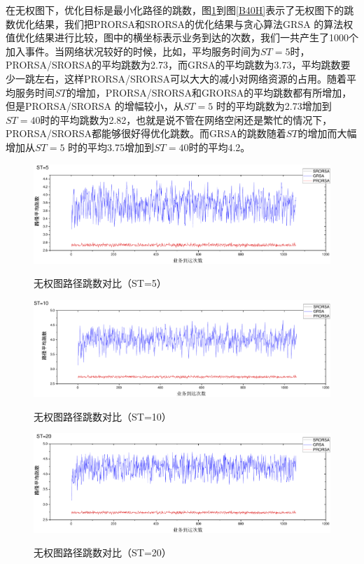 在无权图下，优化目标是最小化路径的跳数，图\ref{B5H}到图\ref{B40H}表示了无权图下的跳数优化结果，我们把PRORSA和SRORSA的优化结果与贪心算法GRSA 的算法权值优化结果进行比较，图中的横坐标表示业务到达的次数，我们一共产生了1000个加入事件。当网络状况较好的时候，比如，平均服务时间为$ST=5$时，PRORSA/SRORSA的平均跳数为2.73，而GRSA的平均跳数为3.73，平均跳数要少一跳左右，这样PRORSA/SRORSA可以大大的减小对网络资源的占用。随着平均服务时间$ST$的增加，PRORSA/SRORSA和GRORSA的平均跳数都有所增加，但是PRORSA/SRORSA 的增幅较小，从$ST=5$ 时的平均跳数为2.73增加到$ST=40$时的平均跳数为2.82，也就是说不管在网络空闲还是繁忙的情况下，PRORSA/SRORSA都能够很好得优化跳数。而GRSA的跳数随着$ST$的增加而大幅增加从$ST=5$ 时的平均3.75增加到$ST=40$时的平均4.2。
\begin{figure}
\setlength{\belowcaptionskip}{-0.5cm}
\begin{center}
{\includegraphics[width=1 \textwidth]{figures/B5H.pdf}}
\end{center}
\caption{{\footnotesize{无权图路径跳数对比（ST=5）}}}
\label{B5H}
\end{figure}
\begin{figure}
\setlength{\belowcaptionskip}{-0.5cm}
\begin{center}
{\includegraphics[width=1 \textwidth]{figures/B10H.pdf}}
\end{center}
\caption{{\footnotesize{无权图路径跳数对比（ST=10）}}}
\label{B10H}
\end{figure}
\begin{figure}
\setlength{\belowcaptionskip}{-0.5cm}
\begin{center}
{\includegraphics[width=1 \textwidth]{figures/B20H.pdf}}
\end{center}
\caption{{\footnotesize{无权图路径跳数对比（ST=20）}}}
\label{B20H}
\end{figure}

